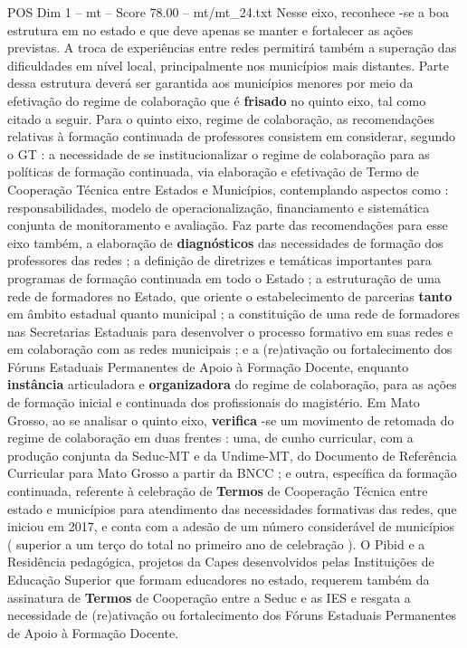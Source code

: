 \begin{textsample}{POS Dim 1 – mt – Score 78.00 – mt/mt\_24.txt}
Nesse eixo, reconhece -se a boa estrutura em no estado e que deve apenas se manter e fortalecer as ações previstas.
A troca de experiências entre redes permitirá também a superação das dificuldades em nível local, principalmente nos municípios mais distantes.
Parte dessa estrutura deverá ser garantida aos municípios menores por meio da efetivação do regime de colaboração que é \textbf{frisado} no quinto eixo, tal como citado a seguir.
Para o quinto eixo, regime de colaboração, as recomendações relativas à formação continuada de professores consistem em considerar, segundo o GT : a necessidade de se institucionalizar o regime de colaboração para as políticas de formação continuada, via elaboração e efetivação de Termo de Cooperação Técnica entre Estados e Municípios, contemplando aspectos como : responsabilidades, modelo de operacionalização, financiamento e sistemática conjunta de monitoramento e avaliação.
Faz parte das recomendações para esse eixo também, a elaboração de \textbf{diagnósticos} das necessidades de formação dos professores das redes ; a definição de diretrizes e temáticas importantes para programas de formação continuada em todo o Estado ; a estruturação de uma rede de formadores no Estado, que oriente o estabelecimento de parcerias \textbf{tanto} em âmbito estadual quanto municipal ; a constituição de uma rede de formadores nas Secretarias Estaduais para desenvolver o processo formativo em suas redes e em colaboração com as redes municipais ; e a (re)ativação ou fortalecimento dos Fóruns Estaduais Permanentes de Apoio à Formação Docente, enquanto \textbf{instância} articuladora e \textbf{organizadora} do regime de colaboração, para as ações de formação inicial e continuada dos profissionais do magistério.
Em Mato Grosso, ao se analisar o quinto eixo, \textbf{verifica} -se um movimento de retomada do regime de colaboração em duas frentes : uma, de cunho curricular, com a produção conjunta da Seduc-MT e da Undime-MT, do Documento de Referência Curricular para Mato Grosso a partir da BNCC ; e outra, específica da formação continuada, referente à celebração de \textbf{Termos} de Cooperação Técnica entre estado e municípios para atendimento das necessidades formativas das redes, que iniciou em 2017, e conta com a adesão de um número considerável de municípios ( superior a um terço do total no primeiro ano de celebração ).
O Pibid e a Residência pedagógica, projetos da Capes desenvolvidos pelas Instituições de Educação Superior que formam educadores no estado, requerem também da assinatura de \textbf{Termos} de Cooperação entre a Seduc e as IES e resgata a necessidade de (re)ativação ou fortalecimento dos Fóruns Estaduais Permanentes de Apoio à Formação Docente.

\end{textsample}

